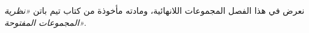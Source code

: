 \documentclass[../../../include/open-logic-chapter]{subfiles}
\begin{document}

\begin{editorial}
نعرض في هذا الفصل المجموعات اللانهائية، ومادته مأخوذة من كتاب تيم باتن \emph{«نظرية المجموعات المفتوحة»}.
\end{editorial}

\end{document}
